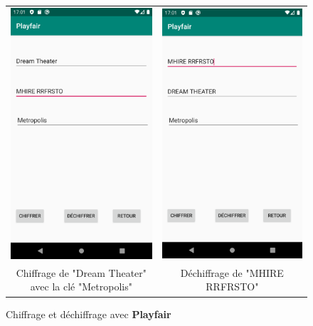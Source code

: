 \documentclass{article}
\begin{document}
\begin{figure}[b!]
    \centering
    \begin{tabular}{cc}
      \includegraphics[width=.35\linewidth]{./img/playfair_e.png} &
      \includegraphics[width=.35\linewidth]{./img/playfair_d.png} \\
      Chiffrage de "Dream Theater" avec la clé "Metropolis" & Déchiffrage de "MHIRE RRFRSTO"\\
    \end{tabular}
    \caption{Chiffrage et déchiffrage avec \textbf{Playfair}}\label{fig:playfair}
\end{figure}
\end{document}
